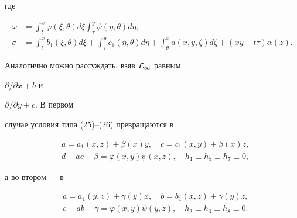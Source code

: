 где


\begin{equation}


\begin{split}


\omega&=\int^x_t\varphi(\xi,\theta)d\xi\int^y_\tau


\psi(\eta,\theta)d\eta,\\


\sigma&=\int^x_t b_1(\xi,\theta)d\xi+\int^y_\tau


c_1(\eta,\theta)d\eta+\int^x_\theta a(x,y,\zeta)d\zeta+


(xy-t\tau)\alpha(z).


\end{split}


\end{equation}





Аналогично можно рассуждать, взяв $\cal L_1$ равным


$\partial/\partial x+b$ и


$\partial/\partial y+c$. В первом


случае условия типа (25)--(26) превращаются в


\begin{equation}


\begin{split}


&a=a_1(x,z)+\beta(x)y,\quad c=c_1(x,y)+\beta(x)z,\\


&d-ac-\beta=\varphi(x,y)\psi(x,z),\quad


h_1\equiv h_5\equiv h_7\equiv 0,


\end{split}


\end{equation}


а во втором --- в


\begin{equation}


\begin{split}


&a=a_1(y,z)+\gamma(y)x,\quad b=b_1(x,z)+\gamma(y)z,\\


&e-ab-\gamma=\varphi(x,y)\psi(y,z),\quad


h_2\equiv h_3\equiv h_8\equiv 0.


\end{split}


\end{equation}


